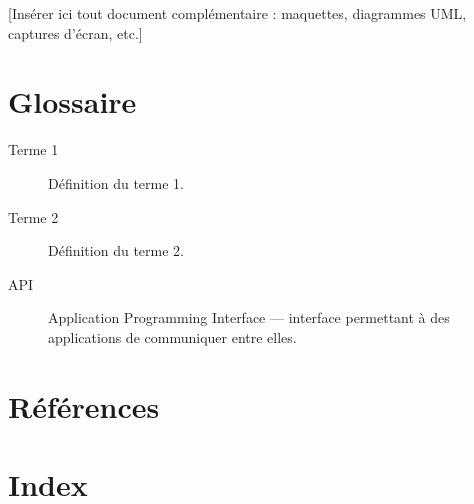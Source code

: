 \documentclass[12pt, a4paper]{article}
\begin{document}
[Insérer ici tout document complémentaire : maquettes, diagrammes UML,
captures d'écran, etc.]

\section{Glossaire}

\begin{description}
  \item[Terme 1] Définition du terme 1.
  \item[Terme 2] Définition du terme 2.
  \item[API] Application Programming Interface --- interface permettant à des
    applications de communiquer entre elles.
\end{description}

\section{Références}

\printbibliography[heading=none]

\section{Index}

\printindex
\end{document}
